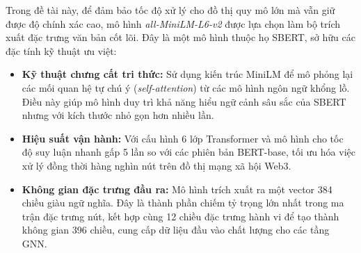 Trong đề tài này, để đảm bảo tốc độ xử lý cho đồ thị quy mô lớn mà vẫn giữ được độ chính xác cao, mô hình \textit{all-MiniLM-L6-v2} được lựa chọn làm bộ trích xuất đặc trưng văn bản cốt lõi. Đây là một mô hình thuộc họ SBERT, sở hữu các đặc tính kỹ thuật ưu việt:\vspace{-0.1cm}
\begin{itemize}[label={--}, itemsep=1pt]
    \item \textbf{Kỹ thuật chưng cất tri thức:} Sử dụng kiến trúc MiniLM để mô phỏng lại các mối quan hệ tự chú ý (\textit{self-attention}) từ các mô hình ngôn ngữ khổng lồ. Điều này giúp mô hình duy trì khả năng hiểu ngữ cảnh sâu sắc của SBERT nhưng với kích thước nhỏ gọn hơn nhiều lần.
    \item \textbf{Hiệu suất vận hành:} Với cấu hình 6 lớp Transformer và mô hình cho tốc độ suy luận nhanh gấp 5 lần so với các phiên bản BERT-base, tối ưu hóa việc xử lý đồng thời hàng nghìn nút trên đồ thị mạng xã hội Web3.
    \item \textbf{Không gian đặc trưng đầu ra:} Mô hình trích xuất ra một vector 384 chiều giàu ngữ nghĩa. Đây là thành phần chiếm tỷ trọng lớn nhất trong ma trận đặc trưng nút, kết hợp cùng 12 chiều đặc trưng hành vi để tạo thành không gian 396 chiều, cung cấp dữ liệu đầu vào chất lượng cho các tầng GNN.
\end{itemize}